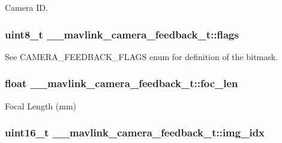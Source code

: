 Camera I\+D. 

\hypertarget{struct____mavlink__camera__feedback__t_a61d934ad402ebb8427cdd640d74f2e44}{
\subsubsection[{flags}]{\setlength{\rightskip}{0pt plus 5cm}uint8\+\_\+t \+\_\+\+\_\+mavlink\+\_\+camera\+\_\+feedback\+\_\+t\+::flags}}\label{struct____mavlink__camera__feedback__t_a61d934ad402ebb8427cdd640d74f2e44}


See C\+A\+M\+E\+R\+A\+\_\+\+F\+E\+E\+D\+B\+A\+C\+K\+\_\+\+F\+L\+A\+G\+S enum for definition of the bitmask. 

\hypertarget{struct____mavlink__camera__feedback__t_a5e8c2ff6273df6d7aa5dce8f0c286d98}{
\subsubsection[{foc\+\_\+len}]{\setlength{\rightskip}{0pt plus 5cm}float \+\_\+\+\_\+mavlink\+\_\+camera\+\_\+feedback\+\_\+t\+::foc\+\_\+len}}\label{struct____mavlink__camera__feedback__t_a5e8c2ff6273df6d7aa5dce8f0c286d98}


Focal Length (mm) 

\hypertarget{struct____mavlink__camera__feedback__t_a7046cdcda0647a8196f095df725f8379}{
\subsubsection[{img\+\_\+idx}]{\setlength{\rightskip}{0pt plus 5cm}uint16\+\_\+t \+\_\+\+\_\+mavlink\+\_\+camera\+\_\+feedback\+\_\+t\+::img\+\_\+idx}}\label{struct____mavlink__camera__feedback__t_a7046cdcda0647a8196f095df725f8379}


